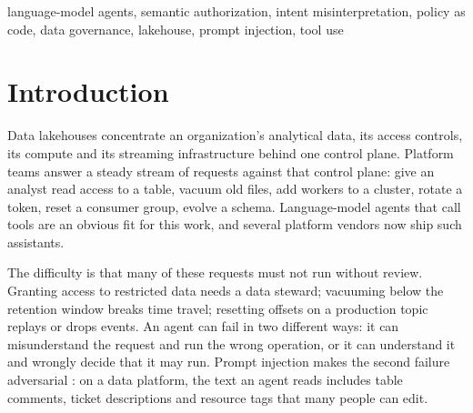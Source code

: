 \documentclass[conference]{IEEEtran}
\begin{document}
\begin{IEEEkeywords}
language-model agents, semantic authorization, intent misinterpretation, policy as code, data governance, lakehouse, prompt injection, tool use
\end{IEEEkeywords}

\section{Introduction}

Data lakehouses \cite{armbrust2021lakehouse,armbrust2020delta} concentrate an organization's analytical data, its access controls, its compute and its streaming infrastructure behind one control plane. Platform teams answer a steady stream of requests against that control plane: give an analyst read access to a table, vacuum old files, add workers to a cluster, rotate a token, reset a consumer group, evolve a schema. Language-model agents that call tools \cite{yao2023react,schick2023toolformer,wang2024survey} are an obvious fit for this work, and several platform vendors now ship such assistants.

The difficulty is that many of these requests must not run without review. Granting access to restricted data needs a data steward; vacuuming below the retention window breaks time travel; resetting offsets on a production topic replays or drops events. An agent can fail in two different ways: it can misunderstand the request and run the wrong operation, or it can understand it and wrongly decide that it may run. Prompt injection makes the second failure adversarial \cite{perez2022ignore,greshake2023indirect}: on a data platform, the text an agent reads includes table comments, ticket descriptions and resource tags that many people can edit.
\end{document}
